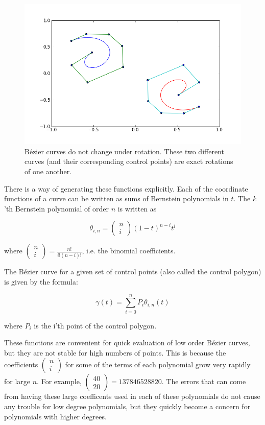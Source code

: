 \begin{figure}
\includegraphics[width=\textwidth]{bezier_rotation}
\caption{B\'{e}zier curves do not change under rotation.
These two different curves (and their corresponding control points) are exact rotations of one another.}
\end{figure}

There is a way of generating these functions explicitly.
Each of the coordinate functions of a curve can be written as sums of Bernstein polynomials in $t$.
The $k$'th Bernstein polynomial of order $n$ is written as

$$\theta_{i,n}=\left( \begin{smallmatrix} n\\ i \end{smallmatrix} \right) (1-t)^{n-i} t^i$$

where $\left( \begin{smallmatrix} n\\ i \end{smallmatrix} \right) = \frac{n!}{i!(n-i)!}$, i.e. the binomial coefficients.

The B\'{e}zier curve for a given set of control points (also called the control polygon) is given by the formula:

$$\gamma (t) = \sum_{i=0}^n P_i \theta_{i,n} (t)$$

where $P_i$ is the i'th point of the control polygon.

These functions are convenient for quick evaluation of low order B\'{e}zier curves, but they are not stable for high numbers of points.
This is because the coefficients $\left( \begin{smallmatrix} n\\ i \end{smallmatrix} \right)$ for some of the terms of each polynomial grow very rapidly for large $n$.
For example, $\left( \begin{smallmatrix} 40\\ 20 \end{smallmatrix} \right)=137846528820$.
The errors that can come from having these large coefficents used in each of these polynomials do not cause any trouble for low degree polynomials, but they quickly become a concern for polynomials with higher degrees.

